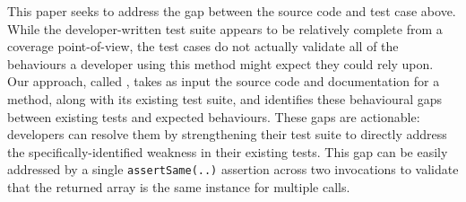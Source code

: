 

This paper seeks to address the gap between the source code and test case above.
While the developer-written test suite appears to be relatively complete from a coverage point-of-view, the test cases do not actually validate all of the behaviours a developer using this method might expect they could rely upon.
%
Our approach, called \toolname, takes as input the source code and documentation for a method, along with its existing test suite, and identifies these behavioural gaps between existing tests and expected behaviours.
These gaps are actionable: developers can resolve them by strengthening their test suite to directly address the specifically-identified weakness in their existing tests.
This gap can be easily addressed by a single \texttt{assertSame(..)} assertion across two invocations to validate that the returned array is the same instance for multiple calls.



